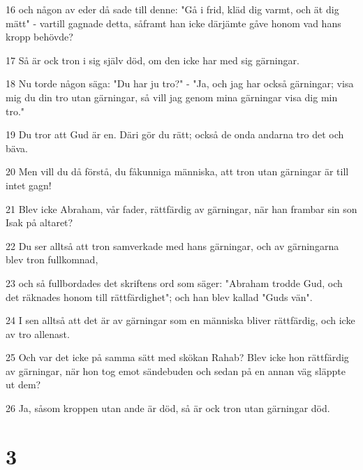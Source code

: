 \par 16 och någon av eder då sade till denne: "Gå i frid, kläd dig varmt, och ät dig mätt" - vartill gagnade detta, såframt han icke därjämte gåve honom vad hans kropp behövde?
\par 17 Så är ock tron i sig själv död, om den icke har med sig gärningar.
\par 18 Nu torde någon säga: "Du har ju tro?" - "Ja, och jag har också gärningar; visa mig du din tro utan gärningar, så vill jag genom mina gärningar visa dig min tro."
\par 19 Du tror att Gud är en. Däri gör du rätt; också de onda andarna tro det och bäva.
\par 20 Men vill du då förstå, du fåkunniga människa, att tron utan gärningar är till intet gagn!
\par 21 Blev icke Abraham, vår fader, rättfärdig av gärningar, när han frambar sin son Isak på altaret?
\par 22 Du ser alltså att tron samverkade med hans gärningar, och av gärningarna blev tron fullkomnad,
\par 23 och så fullbordades det skriftens ord som säger: "Abraham trodde Gud, och det räknades honom till rättfärdighet"; och han blev kallad "Guds vän".
\par 24 I sen alltså att det är av gärningar som en människa bliver rättfärdig, och icke av tro allenast.
\par 25 Och var det icke på samma sätt med skökan Rahab? Blev icke hon rättfärdig av gärningar, när hon tog emot sändebuden och sedan på en annan väg släppte ut dem?
\par 26 Ja, såsom kroppen utan ande är död, så är ock tron utan gärningar död.

\chapter{3}

